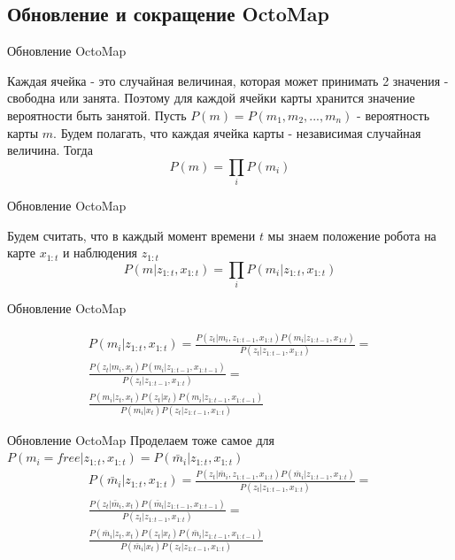 \documentclass[9pt]{beamer}
\begin{document}
\subsection{Обновление и сокращение OctoMap}

\begin{frame}{Обновление OctoMap}

Каждая ячейка - это случайная величиная, которая может принимать 2 значения - свободна или занята. Поэтому для каждой ячейки карты хранится значение вероятности быть занятой. Пусть $P(m) = P(m_1, m_2, ..., m_n)$ - вероятность карты $m$. Будем полагать, что каждая ячейка карты - независимая случайная величина. Тогда
$$P(m) = \prod_{i} P(m_{i})$$

\end{frame}

\begin{frame}{Обновление OctoMap}

Будем считать, что в каждый момент времени $t$ мы знаем положение робота на карте $x_{1:t}$ и наблюдения $z_{1:t}$
$$P(m | z_{1:t}, x_{1:t}) = \prod_{i} P(m_{i}|z_{1:t}, x_{1:t})$$

\end{frame}

\begin{frame}{Обновление OctoMap}
 
\begin{equation}
\begin{split}
P(m_i | z_{1:t}, x_{1:t}) = \frac{P(z_t| m_i, z_{1:t-1}, x_{1:t}) P(m_i| z_{1:t-1}, x_{1:t})}{P(z_t|z_{1:t-1}, x_{1:t})} =\\
\frac{P(z_t| m_i, x_{t}) P(m_i| z_{1:t-1}, x_{1:t-1})}{P(z_t|z_{1:t-1}, x_{1:t})} =\\
\frac{P(m_i| z_t, x_t) P(z_t|x_{t}) P(m_i| z_{1:t-1}, x_{1:t-1})}{P(m_i|x_t) P(z_t|z_{1:t-1}, x_{1:t})}
\end{split}
\end{equation}

\end{frame}

\begin{frame}{Обновление OctoMap}
 Проделаем тоже самое для $P(m_i = free| z_{1:t}, x_{1:t}) = P(\bar m_i| z_{1:t}, x_{1:t})$
\begin{equation}
\begin{split}
P(\bar m_i | z_{1:t}, x_{1:t}) = \frac{P(z_t| \bar m_i, z_{1:t-1}, x_{1:t}) P( \bar m_i| z_{1:t-1}, x_{1:t})}{P(z_t|z_{1:t-1}, x_{1:t})} =\\
\frac{P(z_t| \bar m_i, x_{t}) P( \bar m_i| z_{1:t-1}, x_{1:t-1})}{P(z_t|z_{1:t-1}, x_{1:t})} =\\
\frac{P( \bar m_i| z_t, x_t) P(z_t|x_{t}) P( \bar m_i| z_{1:t-1}, x_{1:t-1})}{P( \bar m_i|x_t) P(z_t|z_{1:t-1}, x_{1:t})}
\end{split}
\end{equation}

\end{frame}
\end{document}
